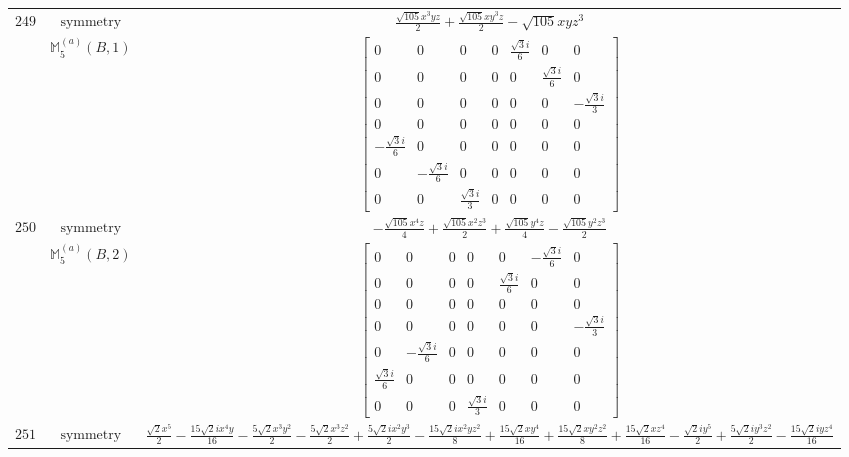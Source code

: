 \documentclass[fleqn,8pt,landscape]{jsarticle}
\begin{document}
\begin{longtable}{ccc}
$ 249 $ & $ \text{symmetry} $ & $ \frac{\sqrt{105} x^{3} y z}{2} + \frac{\sqrt{105} x y^{3} z}{2} - \sqrt{105} x y z^{3} $ \\
$  $ & $ \mathbb{M}_{5}^{(a)}(B,1) $ & $ \begin{bmatrix} 0 & 0 & 0 & 0 & \frac{\sqrt{3} i}{6} & 0 & 0 \\ 0 & 0 & 0 & 0 & 0 & \frac{\sqrt{3} i}{6} & 0 \\ 0 & 0 & 0 & 0 & 0 & 0 & - \frac{\sqrt{3} i}{3} \\ 0 & 0 & 0 & 0 & 0 & 0 & 0 \\ - \frac{\sqrt{3} i}{6} & 0 & 0 & 0 & 0 & 0 & 0 \\ 0 & - \frac{\sqrt{3} i}{6} & 0 & 0 & 0 & 0 & 0 \\ 0 & 0 & \frac{\sqrt{3} i}{3} & 0 & 0 & 0 & 0 \end{bmatrix} $ \\ \hline
$ 250 $ & $ \text{symmetry} $ & $ - \frac{\sqrt{105} x^{4} z}{4} + \frac{\sqrt{105} x^{2} z^{3}}{2} + \frac{\sqrt{105} y^{4} z}{4} - \frac{\sqrt{105} y^{2} z^{3}}{2} $ \\
$  $ & $ \mathbb{M}_{5}^{(a)}(B,2) $ & $ \begin{bmatrix} 0 & 0 & 0 & 0 & 0 & - \frac{\sqrt{3} i}{6} & 0 \\ 0 & 0 & 0 & 0 & \frac{\sqrt{3} i}{6} & 0 & 0 \\ 0 & 0 & 0 & 0 & 0 & 0 & 0 \\ 0 & 0 & 0 & 0 & 0 & 0 & - \frac{\sqrt{3} i}{3} \\ 0 & - \frac{\sqrt{3} i}{6} & 0 & 0 & 0 & 0 & 0 \\ \frac{\sqrt{3} i}{6} & 0 & 0 & 0 & 0 & 0 & 0 \\ 0 & 0 & 0 & \frac{\sqrt{3} i}{3} & 0 & 0 & 0 \end{bmatrix} $ \\ \hline
$ 251 $ & $ \text{symmetry} $ & $ \frac{\sqrt{2} x^{5}}{2} - \frac{15 \sqrt{2} i x^{4} y}{16} - \frac{5 \sqrt{2} x^{3} y^{2}}{2} - \frac{5 \sqrt{2} x^{3} z^{2}}{2} + \frac{5 \sqrt{2} i x^{2} y^{3}}{2} - \frac{15 \sqrt{2} i x^{2} y z^{2}}{8} + \frac{15 \sqrt{2} x y^{4}}{16} + \frac{15 \sqrt{2} x y^{2} z^{2}}{8} + \frac{15 \sqrt{2} x z^{4}}{16} - \frac{\sqrt{2} i y^{5}}{2} + \frac{5 \sqrt{2} i y^{3} z^{2}}{2} - \frac{15 \sqrt{2} i y z^{4}}{16} $ \\

\end{longtable}
\end{document}

